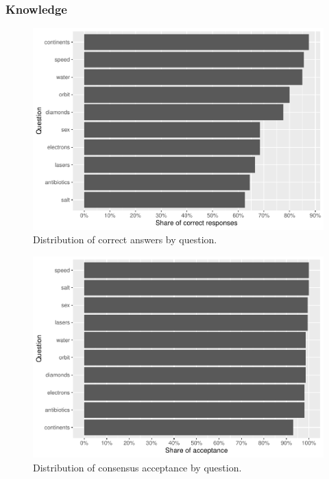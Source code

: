 \documentclass[
  doc,floatsintext]{apa6}
\begin{document}
\subsubsection{Knowledge}\label{knowledge-2}



\begin{figure}
\centering
\includegraphics{output/figures/exp3-questions-knowledge.pdf}
\caption{\label{fig:exp3-questions-knowledge}Distribution of correct answers by question.}
\end{figure}



\begin{figure}
\centering
\includegraphics{output/figures/exp3-questions-acceptance.pdf}
\caption{\label{fig:exp3-questions-acceptance}Distribution of consensus acceptance by question.}
\end{figure}
\end{document}
